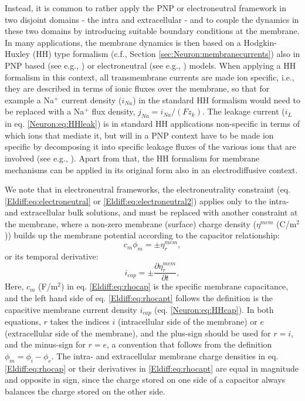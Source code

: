 Instead, it is common to rather apply the PNP or electroneutral framework in two disjoint domains - the intra and extracellular - and to couple the dynamics in these two domains by introducing suitable boundary conditions at the membrane. In many applications, the membrane dynamics is then based on a Hodgkin-Huxley (HH) type formalism (c.f., Section \ref{sec:Neuron:membranecurrents}) also in PNP based (see e.g., \citep{Lopreore2008, Pods2013, Gardner2015, Pods2017}) or electroneutral (see e.g., \citep{Mori2006, Mori2009, Pods2017, ellingsrud2020}) models. When applying a HH formalism in this context, all transmembrane currents are made ion specific, i.e., they are described in terms of ionic fluxes over the membrane, so that for example a Na$^+$ current density ($i_{Na}$) in the standard HH formalism would need to be replaced with a Na$^+$ flux density, $j_{Na} = i_{Na}/(Fz_k)$. The leakage current ($i_L$ in eq. \ref{Neuron:eq:HHleak}) is in standard HH applications non-specific in terms of which ions that mediate it, but will in a PNP context have to be made ion specific by decomposing it into specific leakage fluxes of the various ions that are involved (see e.g., \citep{Pods2013}). Apart from that, the HH formalism for membrane mechanisms can be applied in its original form also in an electrodiffusive context.

We note that in electroneutral frameworks, the electroneutrality constraint (eq. \ref{Eldiff:eq:electroneutral} or \ref{Eldiff:eq:electroneutral2}) applies only to the intra- and extracellular bulk solutions, and must be replaced with another constraint at the membrane, where a non-zero membrane (surface) charge density ($\eta^{mem}$ (C/m$^2$)) builds up the membrane potential according to the capacitor relationship:
\begin{equation}
c_m \phi_{m} = \pm \eta_{r}^{mem},
\label{Eldiff:eq:rhocap}
\end{equation}
or its temporal derivative: 
\begin{equation}
i_{cap} = \pm \frac{\partial \eta_{r}^{mem}}{\partial t},
\label{Eldiff:eq:rhocapt}
\end{equation}
Here, $c_m$ (F/m$^2$) in eq. \ref{Eldiff:eq:rhocap} is the specific membrane capacitance, and the left hand side of eq. \ref{Eldiff:eq:rhocapt} follows the definition is the capacitive membrane current density $i_{cap}$  (eq. \ref{Neuron:eq:HHcap}). In both equations, $r$ takes the indices $i$ (intracellular side of the membrane) or $e$ (extracellular side of the membrane), and the plus-sign should be used for $r=i$, and the minus-sign for $r=e$, a convention that follows from the definition $\phi_{m} = \phi_{i} - \phi_{e}$. The intra- and extracellular membrane charge densities in eq. \ref{Eldiff:eq:rhocap} or their derivatives in \ref{Eldiff:eq:rhocapt} are equal in magnitude and opposite in sign, since the charge stored on one side of a capacitor always balances the charge stored on the other side. 


